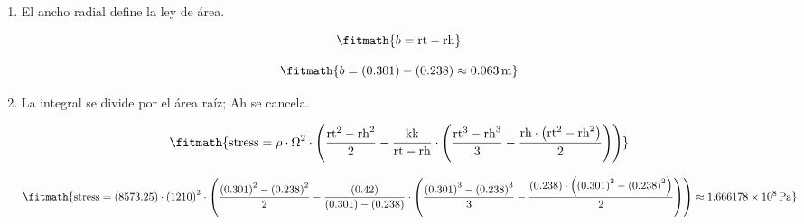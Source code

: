 \begin{enumerate}

\item El ancho radial define la ley de área.

\[\fitmath{b=\mathrm{rt}-\mathrm{rh}}\]

\[\fitmath{b=(0.301)-(0.238)\approx 0.063\,\mathrm{m}}\]

\item La integral se divide por el área raíz; Ah se cancela.

\[\fitmath{\mathrm{stress}=\rho\cdot {\Omega}^{2}\cdot \left(\frac{{\mathrm{rt}}^{2}-{\mathrm{rh}}^{2}}{2}-\frac{\mathrm{kk}}{\mathrm{rt}-\mathrm{rh}}\cdot \left(\frac{{\mathrm{rt}}^{3}-{\mathrm{rh}}^{3}}{3}-\frac{\mathrm{rh}\cdot \left({\mathrm{rt}}^{2}-{\mathrm{rh}}^{2}\right)}{2}\right)\right)}\]

\[\fitmath{\mathrm{stress}=(8573.25)\cdot {(1210)}^{2}\cdot \left(\frac{{(0.301)}^{2}-{(0.238)}^{2}}{2}-\frac{(0.42)}{(0.301)-(0.238)}\cdot \left(\frac{{(0.301)}^{3}-{(0.238)}^{3}}{3}-\frac{(0.238)\cdot \left({(0.301)}^{2}-{(0.238)}^{2}\right)}{2}\right)\right)\approx 1.666178\times10^{8}\,\mathrm{Pa}}\]

\end{enumerate}
